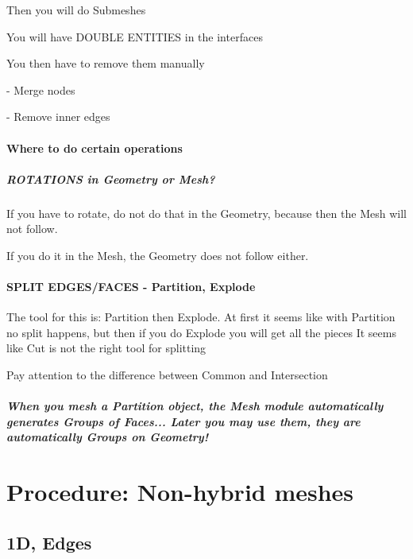 \documentclass[10pt]{book}
\begin{document}
  Then you will do Submeshes
  
  You will have DOUBLE ENTITIES in the interfaces
  
  You then have to remove them manually
  
  
  - Merge nodes
  
  - Remove inner edges
  
  
  
  
 \subsubsection{Where to do certain operations}
 
  \paragraph{ROTATIONS in Geometry or Mesh?}


If you have to rotate, do not do that in the Geometry, because then the Mesh will not follow.

If you do it in the Mesh, the Geometry does not follow either.

\subsubsection{SPLIT EDGES/FACES - Partition, Explode}


The tool for this is: Partition then Explode. At first it seems like with Partition no split happens, but then if you do Explode you will get all the pieces
It seems like Cut is not the right tool for splitting

Pay attention to the difference between Common and Intersection


\paragraph{When you mesh a Partition object, the Mesh module automatically generates Groups of Faces... Later you may use them, they are automatically Groups on Geometry!}


 \chapter{Procedure: Non-hybrid meshes}


 \section{1D, Edges}
\end{document}
